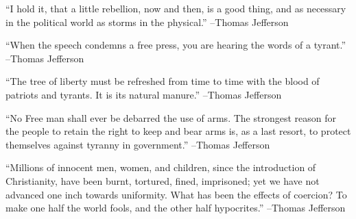 \documentclass{article}%
\begin{document}
\vspace{1mm}%
\begin{minipage}{\textwidth}%
\flushleft%
“I hold it, that a little rebellion, now and then, is a good thing, and as necessary in the political world as storms in the physical.”%
\linebreak%
\vspace{1mm}%
–Thomas Jefferson%
\linebreak%
\vspace{1mm}%
\end{minipage}%
\linebreak%
\vspace{1mm}%
\begin{minipage}{\textwidth}%
\flushleft%
“When the speech condemns a free press, you are hearing the words of a tyrant.”%
\linebreak%
\vspace{1mm}%
–Thomas Jefferson%
\linebreak%
\vspace{1mm}%
\end{minipage}%
\linebreak%
\vspace{1mm}%
\begin{minipage}{\textwidth}%
\flushleft%
“The tree of liberty must be refreshed from time to time with the blood of patriots and tyrants. It is its natural manure.”%
\linebreak%
\vspace{1mm}%
–Thomas Jefferson%
\linebreak%
\vspace{1mm}%
\end{minipage}%
\linebreak%
\vspace{1mm}%
\begin{minipage}{\textwidth}%
\flushleft%
“No Free man shall ever be debarred the use of arms. The strongest reason for the people to retain the right to keep and bear arms is, as a last resort, to protect themselves against tyranny in government.”%
\linebreak%
\vspace{1mm}%
–Thomas Jefferson%
\linebreak%
\vspace{1mm}%
\end{minipage}%
\linebreak%
\vspace{1mm}%
\begin{minipage}{\textwidth}%
\flushleft%
“Millions of innocent men, women, and children, since the introduction of Christianity, have been burnt, tortured, fined, imprisoned; yet we have not advanced one inch towards uniformity. What has been the effects of coercion? To make one half the world fools, and the other half hypocrites.”%
\linebreak%
\vspace{1mm}%
–Thomas Jefferson%
\linebreak%
\vspace{1mm}%
\end{minipage}%
\end{document}
